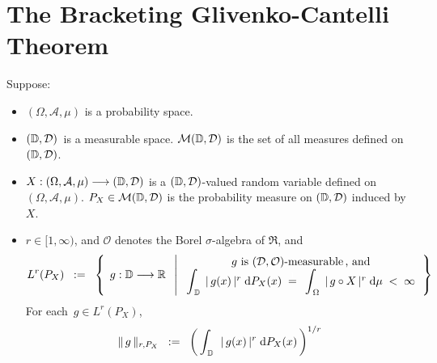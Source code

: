 

\section{The Bracketing Glivenko-Cantelli Theorem}
\setcounter{theorem}{0}
\setcounter{equation}{0}


\renewcommand{\theenumi}{\roman{enumi}}
\renewcommand{\labelenumi}{\textnormal{(\theenumi)}$\;\;$}


\begin{definition}
\mbox{}\vskip 0.1cm
\noindent
Suppose:
\begin{itemize}
\item
	$(\Omega,\mathcal{A},\mu)$ is a probability space.
\item
	$(\mathbb{D},\mathcal{D})$\, is a measurable space.
	$\mathcal{M}(\mathbb{D},\mathcal{D})$ is the set of all measures defined on $(\mathbb{D},\mathcal{D})$.
\item
	$X : (\Omega,\mathcal{A},\mu) \longrightarrow (\mathbb{D},\mathcal{D})$
	is a $(\mathbb{D},\mathcal{D})$-valued random variable defined on
	$(\Omega,\mathcal{A},\mu)$.
	\vskip 0.1cm
	$P_{X} \in \mathcal{M}(\mathbb{D},\mathcal{D})$ is the probability measure
	on $(\mathbb{D},\mathcal{D})$ induced by $X$.
\item
	$r \in [1,\infty)$, and $\mathcal{O}$ denotes the Borel $\sigma$-algebra of $\Re$, and
	\begin{equation*}
	L^{r}(P_{X})
	\;\; := \;\;
		\left\{\;\,
			g : \D \overset{{\color{white}.}}{\longrightarrow} \Re
		\;\;\left\vert\;
			\begin{array}{c}
			\textnormal{$g$ is $(\mathcal{D},\mathcal{O})$-measurable\,, and} \\
			\mathlarger{\int}_{\,\D}\;\, \vert\,g(x)\,\vert^{r} \;\d P_{X}(x)
				\;\overset{{\color{white}1}}{=}\;
				\mathlarger{\,\int}_{\,\Omega}\;\, \vert\,g \circ X\,\vert^{r} \;\d\mu \;<\; \infty
			\end{array}
		\right.
		\right\}
	\end{equation*}
	For each \,$g \in L^{r}(P_{X})$,
	\begin{equation*}
	\Vert\,g\,\Vert_{r,P_{X}} 
	\;\; := \;\;
		\left(\,\int_{\,\D}\;\, \vert\,g(x)\,\vert^{r} \;\d P_{X}(x)\,\right)^{1/r}

\end{equation*}
\end{itemize}
\end{definition}
